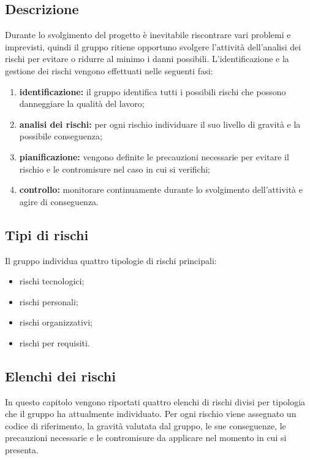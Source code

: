 \subsection{Descrizione}
Durante lo svolgimento del progetto è inevitabile riscontrare vari problemi e imprevisti, quindi il gruppo ritiene opportuno svolgere l’attività dell’analisi dei rischi per evitare o ridurre al minimo i danni possibili.\newline
L’identificazione e la gestione dei rischi vengono effettuati nelle seguenti fasi:
\begin{enumerate}
\item \textbf{identificazione:}  il gruppo identifica tutti i possibili rischi che possono danneggiare la qualità del lavoro;
\item \textbf{analisi dei rischi:} per ogni rischio individuare il suo livello di gravità e la possibile conseguenza;
\item \textbf{pianificazione:} vengono definite le precauzioni necessarie per evitare il rischio e le contromisure nel caso in cui si verifichi;
\item \textbf{controllo:} monitorare continuamente durante lo svolgimento dell’attività e agire di conseguenza.
\end{enumerate}

\subsection{Tipi di rischi}
Il gruppo individua quattro tipologie di rischi principali:
\begin{itemize}
\item rischi tecnologici;
\item rischi personali;
\item rischi organizzativi;
\item rischi per requisiti.
\end{itemize}

\subsection{Elenchi dei rischi}
In questo capitolo vengono riportati quattro elenchi di rischi divisi per tipologia che il gruppo ha attualmente individuato.
Per ogni rischio viene assegnato un codice di riferimento, la gravità valutata dal gruppo, le sue conseguenze, le precauzioni necessarie e le contromisure da applicare nel momento in cui si presenta. 
